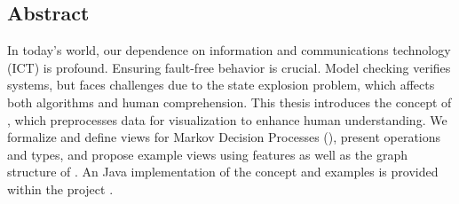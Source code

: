 \documentclass[preview]{standalone}
\begin{document}
\clearpage
\thispagestyle{empty}
\begin{center}
	\section*{Abstract}		
\end{center}
In today's world, our dependence on information and communications technology (ICT) is profound. Ensuring fault-free behavior is crucial. Model checking verifies systems, but faces challenges due to the state explosion problem, which affects both algorithms and human comprehension. This thesis introduces the concept of \emph{\viewN}, which preprocesses data for visualization to enhance human understanding. We formalize and define views for Markov Decision Processes (\mdpsN), present operations and types, and propose example views using \mdpN features as well as the graph structure of \mdpsN. An Java implementation of the concept and examples is provided within the project \pmcvis.
\vfil
\end{document}
